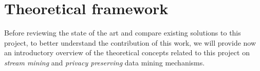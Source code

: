 \chapter{Theoretical framework} %
\label{Chapter2TheoreticalFramework} %


Before reviewing the state of the art and compare existing solutions to this project, to better understand the contribution of this work, we will provide now an introductory overview of the theoretical concepts related to this project on \textit{stream mining} and \textit{privacy preserving} data mining mechanisms.




